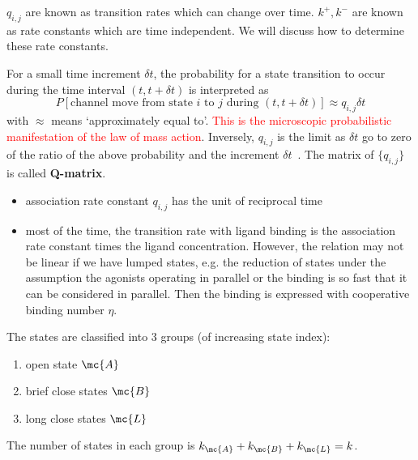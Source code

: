\begin{framed}
  $q_{i,j}$ are known as transition rates which can change over
  time. $k^+, k^-$ are known as rate constants which are time
  independent. We will discuss how to determine these rate constants.
\end{framed}

For a small time increment $\delta t$, the probability for a state
transition to occur during the time interval $(t,t+\delta t)$ is
interpreted as
\begin{equation}
  \label{eq:877}
  P[\text{channel move from state $i$ to $j$ during $(t,t+\delta t)$}]
  \approx q_{i,j}\delta t
\end{equation}
with $\approx$ means `approximately equal to'.
\textcolor{red}{This is the microscopic probabilistic manifestation of
  the law of mass action}.
Inversely, $q_{i,j}$ is the limit as $\delta t$ go to zero of the
ratio of the above probability and the increment $\delta
t$~\citep{colquhoun1982osp}. The matrix of $\{ q_{i,j}\}$ is called
{\bf Q-matrix}.
\begin{itemize}
\item association rate constant $q_{i,j}$ has the unit of reciprocal
  time
\item most of the time, the transition rate with ligand binding is the
  association rate constant times the ligand concentration. However,
  the relation may not be linear if we have lumped states, e.g. the
  reduction of states under the assumption the agonists operating in
  parallel or the binding is so fast that it can be considered in
  parallel. Then the binding is expressed with cooperative binding
  number $\eta$.
\end{itemize}

The states are classified into 3 groups (of increasing state index):
\begin{enumerate}
\item open state $\mc{A}$
\item brief close states $\mc{B}$
\item long close states $\mc{L}$
\end{enumerate}
The number of states in each group is $k_\mc{A}+k_\mc{B}+k_\mc{L} =
k$.

